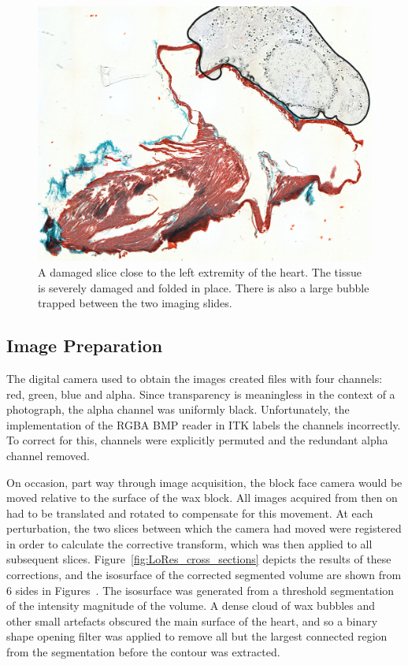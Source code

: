     \begin{figure}[htbp]
      \centering
      \includegraphics[width=.8\textwidth]{Ch5/Figs/damaged_slice}
      \caption{A damaged slice close to the left extremity of the heart. The tissue is severely damaged and folded in place. There is also a large bubble trapped between the two imaging slides.}
      \label{fig:damaged_slice}
    \end{figure}
    
  
  \subsection{Image Preparation} %
  \label{sub:image_preparation}
  	The digital camera used to obtain the images created files with four channels: red, green, blue and alpha. Since transparency is meaningless in the context of a photograph, the alpha channel was uniformly black. Unfortunately, the implementation of the RGBA BMP reader in ITK labels the channels incorrectly. To correct for this, channels were explicitly permuted and the redundant alpha channel removed.
  
    On occasion, part way through image acquisition, the block face camera would be moved relative to the surface of the wax block. All images acquired from then on had to be translated and rotated to compensate for this movement. At each perturbation, the two slices between which the camera had moved were registered in order to calculate the corrective transform, which was then applied to all subsequent slices. Figure~\ref{fig:LoRes_cross_sections} depicts the results of these corrections, and the isosurface of the corrected segmented volume are shown from 6 sides in Figures~. The isosurface was generated from a threshold segmentation of the intensity magnitude of the volume. A dense cloud of wax bubbles and other small artefacts obscured the main surface of the heart, and so a binary shape opening filter was applied to remove all but the largest connected region from the segmentation before the contour was extracted.
    
